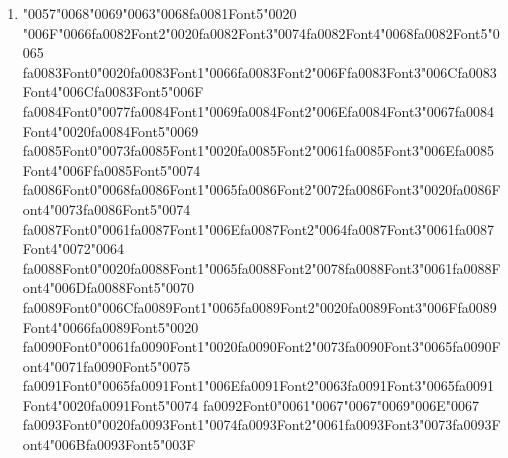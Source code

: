 \documentclass[11pt]{article}
\begin{document}
\begin{enumerate}[label=Q\arabic*., leftmargin=*]
\item {\char"0057}{\char"0068}{\char"0069}{\char"0063}{\char"0068}{\csname fa0081Font5\endcsname\char"0020} {\char"006F}{\char"0066}{\csname fa0082Font2\endcsname\char"0020}{\csname fa0082Font3\endcsname\char"0074}{\csname fa0082Font4\endcsname\char"0068}{\csname fa0082Font5\endcsname\char"0065} {\csname fa0083Font0\endcsname\char"0020}{\csname fa0083Font1\endcsname\char"0066}{\csname fa0083Font2\endcsname\char"006F}{\csname fa0083Font3\endcsname\char"006C}{\csname fa0083Font4\endcsname\char"006C}{\csname fa0083Font5\endcsname\char"006F} {\csname fa0084Font0\endcsname\char"0077}{\csname fa0084Font1\endcsname\char"0069}{\csname fa0084Font2\endcsname\char"006E}{\csname fa0084Font3\endcsname\char"0067}{\csname fa0084Font4\endcsname\char"0020}{\csname fa0084Font5\endcsname\char"0069} {\csname fa0085Font0\endcsname\char"0073}{\csname fa0085Font1\endcsname\char"0020}{\csname fa0085Font2\endcsname\char"0061}{\csname fa0085Font3\endcsname\char"006E}{\csname fa0085Font4\endcsname\char"006F}{\csname fa0085Font5\endcsname\char"0074} {\csname fa0086Font0\endcsname\char"0068}{\csname fa0086Font1\endcsname\char"0065}{\csname fa0086Font2\endcsname\char"0072}{\csname fa0086Font3\endcsname\char"0020}{\csname fa0086Font4\endcsname\char"0073}{\csname fa0086Font5\endcsname\char"0074} {\csname fa0087Font0\endcsname\char"0061}{\csname fa0087Font1\endcsname\char"006E}{\csname fa0087Font2\endcsname\char"0064}{\csname fa0087Font3\endcsname\char"0061}{\csname fa0087Font4\endcsname\char"0072}{\char"0064} {\csname fa0088Font0\endcsname\char"0020}{\csname fa0088Font1\endcsname\char"0065}{\csname fa0088Font2\endcsname\char"0078}{\csname fa0088Font3\endcsname\char"0061}{\csname fa0088Font4\endcsname\char"006D}{\csname fa0088Font5\endcsname\char"0070} {\csname fa0089Font0\endcsname\char"006C}{\csname fa0089Font1\endcsname\char"0065}{\csname fa0089Font2\endcsname\char"0020}{\csname fa0089Font3\endcsname\char"006F}{\csname fa0089Font4\endcsname\char"0066}{\csname fa0089Font5\endcsname\char"0020} {\csname fa0090Font0\endcsname\char"0061}{\csname fa0090Font1\endcsname\char"0020}{\csname fa0090Font2\endcsname\char"0073}{\csname fa0090Font3\endcsname\char"0065}{\csname fa0090Font4\endcsname\char"0071}{\csname fa0090Font5\endcsname\char"0075} {\csname fa0091Font0\endcsname\char"0065}{\csname fa0091Font1\endcsname\char"006E}{\csname fa0091Font2\endcsname\char"0063}{\csname fa0091Font3\endcsname\char"0065}{\csname fa0091Font4\endcsname\char"0020}{\csname fa0091Font5\endcsname\char"0074} {\csname fa0092Font0\endcsname\char"0061}{\char"0067}{\char"0067}{\char"0069}{\char"006E}{\char"0067} {\csname fa0093Font0\endcsname\char"0020}{\csname fa0093Font1\endcsname\char"0074}{\csname fa0093Font2\endcsname\char"0061}{\csname fa0093Font3\endcsname\char"0073}{\csname fa0093Font4\endcsname\char"006B}{\csname fa0093Font5\endcsname\char"003F}


\end{enumerate}
\end{document}
